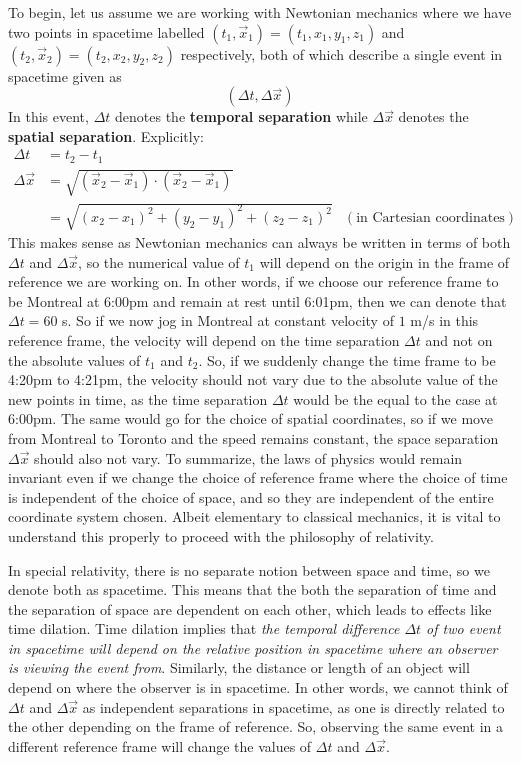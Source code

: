\documentclass{article}
\begin{document}
 		\pagebreak
 		To begin, let us assume we are working with Newtonian mechanics where we have two points in spacetime labelled $(t_1, \vec{x}_1) = (t_1, x_1, y_1, z_1)$ and $(t_2, \vec{x}_2) = (t_2, x_2, y_2, z_2)$ respectively, both of which describe a single event in spacetime given as $$(\Delta t, \Delta \vec{x})$$ 
 		In this event, $\Delta t$ denotes the \textbf{temporal separation} while $\Delta \vec{x}$ denotes the \textbf{spatial separation}. Explicitly:
 		\begin{align*}
 			\Delta t &=	t_2 - t_1\\
 			\Delta \vec{x} &= \sqrt{(\vec{x}_2 - \vec{x}_1)\cdot (\vec{x}_2 - \vec{x}_1)}\\ 
 			&= \sqrt{(x_2 - x_1)^2 + (y_2 - y_1)^2 + (z_2 - z_1)^2} & (\text{in Cartesian coordinates})
 		\end{align*}
 		This makes sense as Newtonian mechanics can always be written in terms of both $\Delta t$ and $\Delta \vec{x}$, so the numerical value of $t_1$ will depend on the origin in the frame of reference we are working on. In other words, if we choose our reference frame to be Montreal at 6:00pm and remain at rest until 6:01pm, then we can denote that $\Delta t = 60$ s. So if we now jog in Montreal at constant velocity of $1$ m/s in this reference frame, the velocity will depend on the time separation $\Delta t$ and not on the absolute values of $t_1$ and $t_2$. So, if we suddenly change the time frame to be 4:20pm to 4:21pm, the velocity should not vary due to the absolute value of the new points in time, as the time separation $\Delta t$ would be the equal to the case at 6:00pm. The same would go for the choice of spatial coordinates, so if we move from Montreal to Toronto and the speed remains constant, the space separation $\Delta \vec{x}$ should also not vary. To summarize, the laws of physics would remain invariant even if we change the choice of reference frame where the choice of time is independent of the choice of space, and so they are independent of the entire coordinate system chosen. Albeit elementary to classical mechanics, it is vital to understand this properly to proceed with the philosophy of relativity.
 		
 		In special relativity, there is no separate notion between space and time, so we denote both as spacetime. This means that the both the separation of time and the separation of space are dependent on each other, which leads to effects like time dilation. Time dilation implies that \textit{the temporal difference $\Delta t$ of two event in spacetime will depend on the relative position in spacetime where an observer is viewing the event from}. Similarly, the distance or length of an object will depend on where the observer is in spacetime. In other words, we cannot think of $\Delta t$ and $\Delta \vec{x}$ as independent separations in spacetime, as one is directly related to the other depending on the frame of reference. So, observing the same event in a different reference frame will change the values of $\Delta t$ and $\Delta \vec{x}$. 
 		
\end{document}
